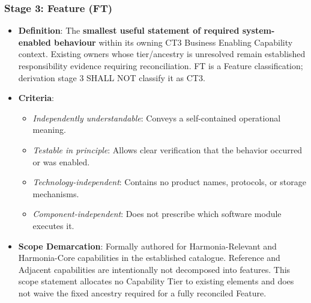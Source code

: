 \label{rad:tier-model:120}
\subsubsection*{Stage 3: Feature (FT)}
\label{rad:tier-model:121}

\begin{itemize}

\item
\textbf{Definition}: The \textbf{smallest useful statement of required system-enabled behaviour} within its owning CT3 Business Enabling Capability context. Existing owners whose tier/\allowbreak{}ancestry is unresolved remain established responsibility evidence requiring reconciliation. FT is a Feature classification; derivation stage 3 SHALL NOT classify it as CT3.



\item
\textbf{Criteria}:


\begin{itemize}

\item
\emph{Independently understandable}: Conveys a self-contained operational meaning.



\item
\emph{Testable in principle}: Allows clear verification that the behavior occurred or was enabled.



\item
\emph{Technology-independent}: Contains no product names, protocols, or storage mechanisms.



\item
\emph{Component-independent}: Does not prescribe which software module executes it.



\end{itemize}


\item
\textbf{Scope Demarcation}: Formally authored for Harmonia-Relevant and Harmonia-Core capabilities in the established catalogue. Reference and Adjacent capabilities are intentionally not decomposed into features. This scope statement allocates no Capability Tier to existing elements and does not waive the fixed ancestry required for a fully reconciled Feature.



\end{itemize}
\label{rad:tier-model:129}
